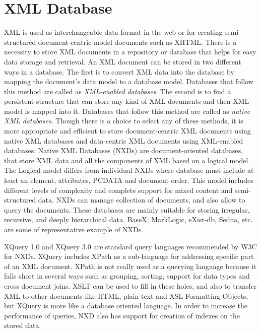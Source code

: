 \section{XML Database}

  XML is used as interchangeable data format in the web or for creating semi-structured document-centric model documents such as XHTML. There is a necessity to store XML documents in a repository or database that helps for easy data storage and retrieval. An XML document can be stored in two different ways in a database. The first is to convert XML data into the database by mapping the document's data model to a database model. Databases that follow this method are called as \textit{XML-enabled databases}. The second is to find a persistent structure that can store any kind of XML documents and then XML model is mapped into it. Databases that follow this method are called as \textit{native XML databases}\cite{pavlovic2007native}. Though there is a choice to select any of these methods, it is more appropriate and efficient to store document-centric XML documents using native XML databases and data-centric  XML documents using XML-enabled databases.	Native XML Databases (NXDs) are document-oriented databases, that store XML data and all the components of XML based on a logical model. The Logical model differs from individual NXDs where database must include at least an element, attributes, PCDATA and document order. This model includes different levels of complexity and complete support for mixed content and semi-structured data. NXDs can manage collection of documents, and also allow to query the documents. These databases are mainly suitable for storing irregular, recursive, and deeply hierarchical data.  BaseX, MarkLogic, eXist-db, Sedna, etc. are some of representative example of  NXDs. 
  \par XQuery 1.0 and XQuery 3.0 are standard query languages recommended by W3C for NXDs. XQuery includes XPath as a sub-language for addressing specific part of an XML document. XPath is not really used as a querying language because it falls short in several ways such as grouping, sorting, support for data types and cross document joins. XSLT can be used to fill in these holes, and also to transfer XML to other documents like HTML, plain text and XSL Formatting Objects, but XQuery is more like a database oriented language.  In order to increase the performance of queries, NXD also has support for creation of indexes on the stored data.\cite{pavlovic2007native}
